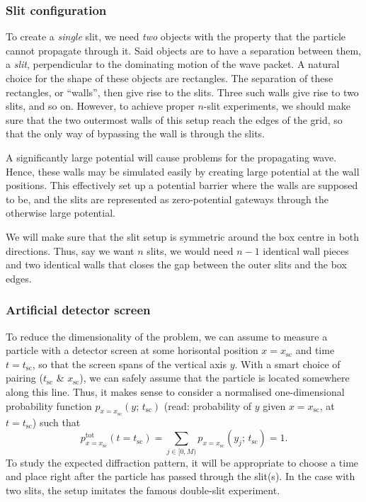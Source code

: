     \subsubsection{Slit configuration}\label{sec:methods:simulation:slit_config}

        To create a \textit{single} slit, we need \textit{two} objects with the property that the particle cannot propagate through it. Said objects are to have a separation between them, a \textit{slit}, perpendicular to the dominating motion of the wave packet. A natural choice for the shape of these objects are rectangles. The separation of these rectangles, or ``walls'', then give rise to the slits. Three such walls give rise to two slits, and so on. However, to achieve proper $n$-slit experiments, we should make sure that the two outermost walls of this setup reach the edges of the grid, so that the only way of bypassing the wall is through the slits.

        A significantly large potential will cause problems for the propagating wave. Hence, these walls may be simulated easily by creating large potential at the wall positions. This effectively set up a potential barrier where the walls are supposed to be, and the slits are represented as zero-potential gateways through the otherwise large potential.

        We will make sure that the slit setup is symmetric around the box centre in both directions. Thus, say we want $n$ slits, we would need $n-1$ identical wall pieces and two identical walls that closes the gap between the outer slits and the box edges.
    
    \subsubsection{Artificial detector screen}\label{sec:methods:simulation:screen}

        To reduce the dimensionality of the problem, we can assume to measure a particle with a detector screen at some horisontal position $x=x_\mathrm{sc}$ and time $t=t_\mathrm{sc}$, so that the screen spans of the vertical axis $y$. With a smart choice of pairing ($t_\mathrm{sc}$ \& $x_\mathrm{sc}$), we can safely assume that the particle is located somewhere along this line. Thus, it makes sense to consider a normalised one-dimensional probability function $p_{x=x_\mathrm{sc}}(y;\, t_\mathrm{sc})$ (read: probability of $y$ given $x=x_\mathrm{sc}$, at $t=t_\mathrm{sc}$) such that
        \begin{equation}\label{eq:tot_probability_along_y}
            p^\mathrm{tot}_{x=x_\mathrm{sc}}(t\!=\!t_\mathrm{sc}) =\sum_{j\in [0, M)} p_{x=x_\mathrm{sc}}(y_j;\, t_\mathrm{sc}) = 1.
        \end{equation}
        To study the expected diffraction pattern, it will be appropriate to choose a time and place right after the particle has passed through the slit(s). In the case with two slits, the setup imitates the famous double-slit experiment.

